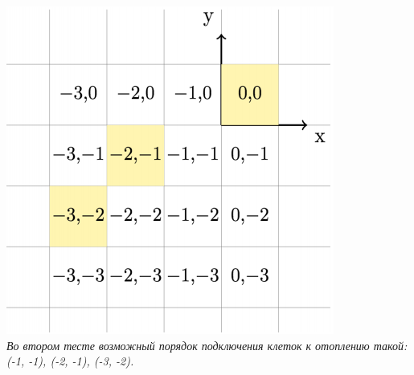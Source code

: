 \begin{problem}
\begin{center}
\includegraphics[scale=0.5]{images/4.png}\\
\textit{Во втором тесте возможный порядок подключения клеток к отоплению такой: (-1, -1), (-2, -1), (-3, -2).}
\end{center}

\end{problem}
